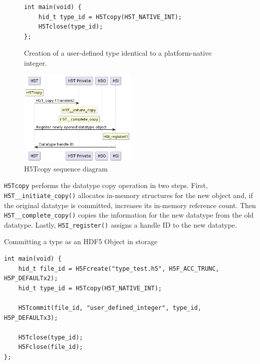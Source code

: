 \begin{figure}
\centering
\caption{Creation of a user-defined type identical to a platform-native integer.}
\label{fig:predefined-type-copy}
\begin{verbatim}
int main(void) {
    hid_t type_id = H5Tcopy(H5T_NATIVE_INT);
    H5Tclose(type_id);
};

\end{verbatim}
\end{figure} 

\begin{figure}
    \centering
    \includegraphics[width=0.5\textwidth]{images/tour_5_uml_datatype_copy.png}
    \caption{H5Tcopy sequence diagram}
    \label{fig:tour-5-uml-datatype-copy}
\end{figure}

\texttt{H5Tcopy} performs the datatype copy operation in two steps. First, \texttt{H5T\_\_initiate\_copy()} allocates in-memory structures for the new object and, if the original datatype is committed, increases its in-memory reference count. Then \texttt{H5T\_\_complete\_copy()} copies the information for the new datatype from the old datatype. Lastly, \texttt{H5I\_register()} assigns a handle ID to the new datatype.

\begin{listing}
\centering
\caption{Committing a type as an HDF5 Object in storage}
\label{lst:type-commit}
\begin{verbatim}
int main(void) {
    hid_t file_id = H5Fcreate("type_test.h5", H5F_ACC_TRUNC, H5P_DEFAULTx2);
    hid_t type_id = H5Tcopy(H5T_NATIVE_INT);
    
    H5Tcommit(file_id, "user_defined_integer", type_id, H5P_DEFAULTx3);

    H5Tclose(type_id);
    H5Fclose(file_id);
};

\end{verbatim}
\end{listing}

